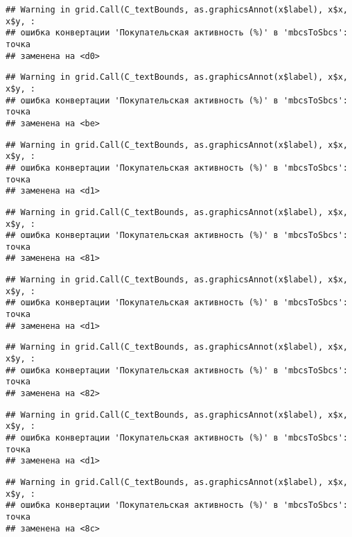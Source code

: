\documentclass[
]{article}
\begin{document}
\begin{verbatim}
## Warning in grid.Call(C_textBounds, as.graphicsAnnot(x$label), x$x, x$y, :
## ошибка конвертации 'Покупательская активность (%)' в 'mbcsToSbcs': точка
## заменена на <d0>
\end{verbatim}

\begin{verbatim}
## Warning in grid.Call(C_textBounds, as.graphicsAnnot(x$label), x$x, x$y, :
## ошибка конвертации 'Покупательская активность (%)' в 'mbcsToSbcs': точка
## заменена на <be>
\end{verbatim}

\begin{verbatim}
## Warning in grid.Call(C_textBounds, as.graphicsAnnot(x$label), x$x, x$y, :
## ошибка конвертации 'Покупательская активность (%)' в 'mbcsToSbcs': точка
## заменена на <d1>
\end{verbatim}

\begin{verbatim}
## Warning in grid.Call(C_textBounds, as.graphicsAnnot(x$label), x$x, x$y, :
## ошибка конвертации 'Покупательская активность (%)' в 'mbcsToSbcs': точка
## заменена на <81>
\end{verbatim}

\begin{verbatim}
## Warning in grid.Call(C_textBounds, as.graphicsAnnot(x$label), x$x, x$y, :
## ошибка конвертации 'Покупательская активность (%)' в 'mbcsToSbcs': точка
## заменена на <d1>
\end{verbatim}

\begin{verbatim}
## Warning in grid.Call(C_textBounds, as.graphicsAnnot(x$label), x$x, x$y, :
## ошибка конвертации 'Покупательская активность (%)' в 'mbcsToSbcs': точка
## заменена на <82>
\end{verbatim}

\begin{verbatim}
## Warning in grid.Call(C_textBounds, as.graphicsAnnot(x$label), x$x, x$y, :
## ошибка конвертации 'Покупательская активность (%)' в 'mbcsToSbcs': точка
## заменена на <d1>
\end{verbatim}

\begin{verbatim}
## Warning in grid.Call(C_textBounds, as.graphicsAnnot(x$label), x$x, x$y, :
## ошибка конвертации 'Покупательская активность (%)' в 'mbcsToSbcs': точка
## заменена на <8c>
\end{verbatim}
\end{document}
